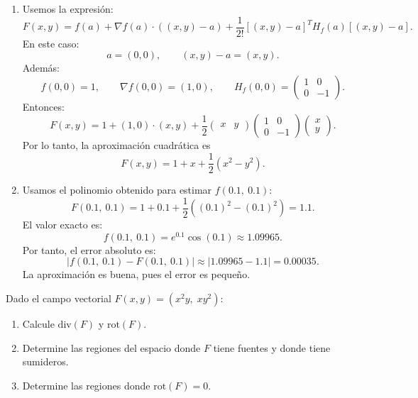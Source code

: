 \documentclass[11pt,respuestas,a4]{aleph-examen}
\begin{document}
\begin{preguntas}
\begin{respuesta}
\begin{enumerate}
    \item Usemos la expresión:
    \[
        F(x,y)
        =
        f(a)
        +
        \nabla f(a)\cdot ((x,y)-a)
        +
        \frac{1}{2!}[(x,y)-a]^T H_f(a)[(x,y)-a].
    \]
    En este caso:
    \[
        a=(0,0),
        \qquad
        (x,y)-a=(x,y).
    \]
    Además:
    \[
        f(0,0)
        =
        1,
        \qquad
        \nabla f(0,0)
        =
        (1,0),
        \qquad
        H_f(0,0)
        =
        \begin{pmatrix}
            1 & 0\\
            0 & -1
        \end{pmatrix}.
    \]
    Entonces:
    \[
        F(x,y)
        =
        1
        +
        (1,0)\cdot(x,y)
        +
        \frac{1}{2}
        \begin{pmatrix}
            x & y
        \end{pmatrix}
        \begin{pmatrix}
            1 & 0\\
            0 & -1
        \end{pmatrix}
        \begin{pmatrix}
            x\\
            y
        \end{pmatrix}.
    \]
    Por lo tanto, la aproximación cuadrática es
    \[
        F(x,y)
        =
        1+x+\frac{1}{2}(x^2-y^2).
    \]

    \item Usamos el polinomio obtenido para estimar \(f(0.1,\ 0.1)\):
    \[
        F(0.1,\ 0.1)
        =
        1+0.1+\frac{1}{2}\left((0.1)^2-(0.1)^2\right)
        =
        1.1.
    \]
    El valor exacto es:
    \[
        f(0.1,\ 0.1)
        =
        e^{0.1}\cos(0.1)
        \approx
        1.09965.
    \]
    Por tanto, el error absoluto es:
    \[
        |f(0.1,\ 0.1)-F(0.1,\ 0.1)|
        \approx
        |1.09965-1.1|
        =
        0.00035.
    \]
    La aproximación es buena, pues el error es pequeño.\qedhere
\end{enumerate}
\end{respuesta}

\item
Dado el campo vectorial $F(x,y) = (x^2y,\; xy^2)$:
\begin{enumerate}
    \item Calcule $\mathrm{div}(F)$ y $\mathrm{rot}(F)$.
    \item Determine las regiones del espacio donde $F$ tiene fuentes y donde tiene sumideros.
    \item Determine las regiones donde $\mathrm{rot}(F)=0$.
\end{enumerate}


\end{preguntas}
\end{document}
